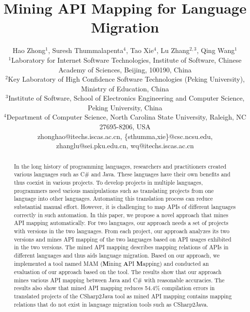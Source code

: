 \documentclass{sig-alternate}
\begin{document}

\title{Mining API Mapping for Language Migration}

\author{
Hao Zhong$^{1}$, Suresh Thummalapenta$^4$, Tao Xie$^4$, Lu Zhang$^{2,3}$, Qing Wang$^{1}$\\
\small{$^1$Laboratory for Internet Software Technologies, Institute of Software, Chinese Academy of Sciences, Beijing, 100190, China}\\
\small{$^2$Key Laboratory of High Confidence Software Technologies (Peking University), Ministry of Education, China}\\
\small{$^3$Institute of Software, School of Electronics Engineering and Computer Science, Peking University, China} \\
\small{$^4$Department of Computer Science, North Carolina State University, Raleigh, NC 27695-8206, USA}\\
\small{zhonghao@itechs.iscas.ac.cn, \{sthumma,xie\}@csc.ncsu.edu,
zhanglu@sei.pku.edu.cn, wq@itechs.iscas.ac.cn}}

\maketitle
\thispagestyle{empty}

\begin{abstract}
In the long history of programming languages, researchers and
practitioners created various languages such as C\# and Java. These
languages have their own benefits and thus coexist in various
projects. To develop projects in multiple languages, programmers
need various manipulations such as translating projects from one
language into other languages. Automating this translation process
can reduce substantial manual effort. However, it is  challenging to
map APIs of different languages correctly in such automation. In
this paper, we propose a novel approach that mines API mapping
automatically. For two languages, our approach needs a set of
projects with versions in the two languages. From each project, our
approach analyzes its two versions and mines API mapping of the two
languages based on API usages exhibited in the two versions. The
mined API mapping describes mapping relations of APIs in different
languages and thus aids language migration. Based on our approach,
we implemented a tool named MAM (\textbf{M}ining \textbf{A}PI
\textbf{M}apping) and conducted an evaluation of our approach based
on the tool. The results show that our approach mines various API
mapping between Java and C\# with reasonable accuracies. The results
also show that mined API mapping reduces 54.4\% compilation errors
in translated projects of the CSharp2Java tool as mined API mapping
contains mapping relations that do not exist in language migration
tools such as CSharp2Java.
\end{abstract}
\end{document}
